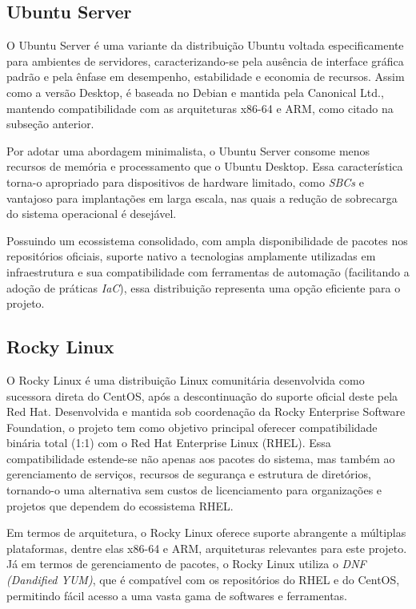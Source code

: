 \subsection{Ubuntu Server}
\label{subsection:UbuntuServer}

O Ubuntu Server é uma variante da distribuição Ubuntu voltada especificamente para ambientes de servidores, caracterizando-se pela ausência de interface gráfica padrão e pela ênfase em desempenho, estabilidade e economia de recursos. Assim como a versão Desktop, é baseada no Debian e mantida pela Canonical Ltd., mantendo compatibilidade com as arquiteturas x86-64 e ARM, como citado na subseção anterior.

Por adotar uma abordagem minimalista, o Ubuntu Server consome menos recursos de memória e processamento que o Ubuntu Desktop. Essa característica torna-o apropriado para dispositivos de hardware limitado, como \textit{SBCs} e vantajoso para implantações em larga escala, nas quais a redução de sobrecarga do sistema operacional é desejável.

Possuindo um ecossistema consolidado, com ampla disponibilidade de pacotes nos repositórios oficiais, suporte nativo a tecnologias amplamente utilizadas em infraestrutura e sua compatibilidade com ferramentas de automação (facilitando a adoção de práticas \textit{IaC}), essa distribuição representa uma opção eficiente para o projeto.

\subsection{Rocky Linux}
\label{subsection:RockyLinux}

O Rocky Linux é uma distribuição Linux comunitária desenvolvida como sucessora direta do CentOS, após a descontinuação do suporte oficial deste pela Red Hat. Desenvolvida e mantida sob coordenação da Rocky Enterprise Software Foundation, o projeto tem como objetivo principal oferecer compatibilidade binária total (1:1) com o Red Hat Enterprise Linux (RHEL). Essa compatibilidade estende-se não apenas aos pacotes do sistema, mas também ao gerenciamento de serviços, recursos de segurança e estrutura de diretórios, tornando-o uma alternativa sem custos de licenciamento para organizações e projetos que dependem do ecossistema RHEL.

Em termos de arquitetura, o Rocky Linux oferece suporte abrangente a múltiplas plataformas, dentre elas x86-64 e ARM, arquiteturas relevantes para este projeto. Já em termos de gerenciamento de pacotes, o Rocky Linux utiliza o \textit{DNF (Dandified YUM)}, que é compatível com os repositórios do RHEL e do CentOS, permitindo fácil acesso a uma vasta gama de softwares e ferramentas.

